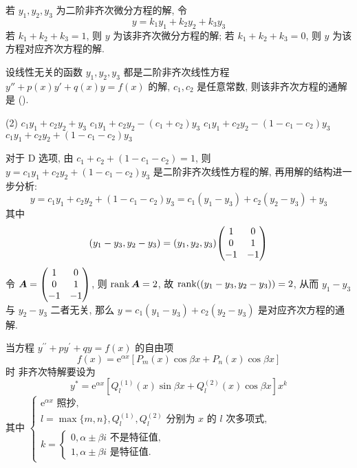 \begin{theorem}[二阶常系数非齐次线性微分方程解的性质]
    若 $y_1, y_2, y_3$ 为二阶非齐次微分方程的解, 令 $$
        y=k_1y_1 +k_2y_2 +k_3y_3
    $$
    若 $k_1+ k_2+ k_3=1$, 则 $y$ 为该非齐次微分方程的解; 若 $k_1+ k_2+ k_3=0$, 则 $y$ 为该方程对应齐次方程的解.
\end{theorem}

\begin{example}
    设线性无关的函数 $y_1, y_2, y_3$ 都是二阶非齐次线性方程 $y''+p(x)y'+q(x)y=f(x)$ 的解, $c_1,c_2$ 是任意常数,
    则该非齐次方程的通解是 (\quad).
    \begin{tasks}(2)
        \task $c_1y_1+c_2y_2+y_3$
        \task $c_1y_1+c_2y_2-(c_1+c_2)y_3$
        \task $c_1y_1+c_2y_2-(1-c_1-c_2)y_3$
        \task $c_1y_1+c_2y_2+(1-c_1-c_2)y_3$
    \end{tasks}
\end{example}
\begin{solution}
    对于 D 选项, 由 $c_1+c_2+(1-c_1-c_2)=1$, 则 $y=c_1y_1+c_2y_2+(1-c_1-c_2)y_3$ 是二阶非齐次线性方程的解, 再用解的结构进一步分析:
    $$
        y=c_1y_1+c_2y_2+(1-c_1-c_2)y_3=c_1(y_1-y_3)+c_2(y_2-y_3)+y_3
    $$
    其中 $$
        (y_1-y_3,y_2-y_3)=(y_1, y_2, y_3)\mqty(1&0\\ 0&1\\ -1&-1)
    $$
    令 $\vb*{A}=\mqty(1&0\\ 0&1\\ -1&-1)$, 则 $\rank\vb*{A}=2$, 故 $\rank((y_1-y_3,y_2-y_3))=2$, 从而 $y_1-y_3$ 与 $y_2-y_3$ 二者无关, 那么 $y=c_1(y_1-y_3)+c_2(y_2-y_3)$ 是对应齐次方程的通解.
\end{solution}

\begin{theorem}
    当方程 $ y^{\prime \prime}+p y^{\prime}+q y=f(x) $ 的自由项
    $$f(x)=\mathrm{e}^{\alpha x}\left[P_{m}(x) \cos \beta x+P_{n}(x) \cos \beta x\right] $$ 时
    非齐次特解要设为
    $$y^{*}=\mathrm{e}^{\alpha x}\left[Q_{l}^{(1)}(x) \sin \beta x+Q_{l}^{(2)}(x) \cos \beta x\right] x^{k}$$
    其中 $\begin{cases}
        \mathrm{e}^{\alpha x} \text { 照抄,  } \\ l=\max \{m, n\}, Q_{l}^{(1)}, Q_{l}^{(2)} \text { 分别为 } x \text { 的 } l \text { 次多项式,  } \\ k=\begin{cases}
            0, \alpha \pm \beta i \text { 不是特征值,  } \\ 1, \alpha \pm \beta i \text { 是特征值. }
        \end{cases}
    \end{cases}$
\end{theorem}

